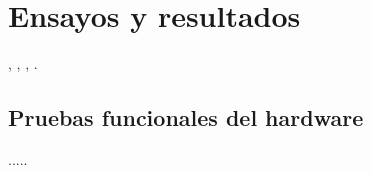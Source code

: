
\chapter{Ensayos y resultados} %

\label{Chapter4} %
\citep{ARTICLE:1}, \citep{BOOK:1}, \citep{BOOK:2}, \citep{WEBSITE:1}.


\section{Pruebas funcionales del hardware}
\label{sec:pruebasHW}

.....
